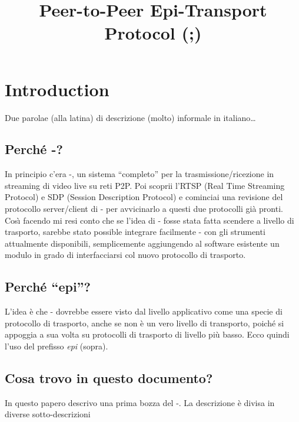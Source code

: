 \documentclass{rfc}
\title{Peer-to-Peer Epi-Transport Protocol (\ppmtp;)}
\author{
\fullname{Riccardo Bernardini}
\organization{DIEGM -- University of Udine}
\address{street=Via delle Scienze, 208;city=Udine;code=33100;country=IT;email=bernardini@uniud.it}}
\begin{document}
\maketitle

\tableofcontents

\chapter{Introduction}
\label{sect:intro;driver}

Due parolae (alla latina) di descrizione (molto) informale in
italiano\ldots

\section{Perch\'e \ppetp-?}
In principio c'era \medusa-, un sistema ``completo'' per la
trasmissione/ricezione in streaming di video live su reti P2P.  Poi
scoprii l'RTSP (Real Time Streaming Protocol) e SDP (Session
Description Protocol) e cominciai una revisione del protocollo
server/client di \medusa- per avvicinarlo a questi due protocolli
gi\`a pronti.  Cos\`\i{} facendo mi resi conto che se l'idea di
\medusa- fosse stata fatta scendere a livello di trasporto, sarebbe
stato possible integrare facilmente \medusa-  con gli strumenti
attualmente disponibili, semplicemente aggiungendo al software
esistente un modulo in grado di interfacciarsi col nuovo protocollo di
trasporto.  

\section{Perch\'e ``epi''?} L'idea \`e che \ppetp- dovrebbe essere
visto dal livello applicativo come una specie di protocollo di
trasporto, anche se non \`e un vero livello di transporto, poich\'e si
appoggia a sua volta su protocolli di trasporto di livello pi\`u
basso.  Ecco quindi l'uso del prefisso \emph{epi} (sopra).


\section{Cosa trovo in questo documento?}
In questo papero descrivo una prima bozza del \ppetp-.  La descrizione
\`e divisa in diverse sotto-descrizioni
\end{document}
